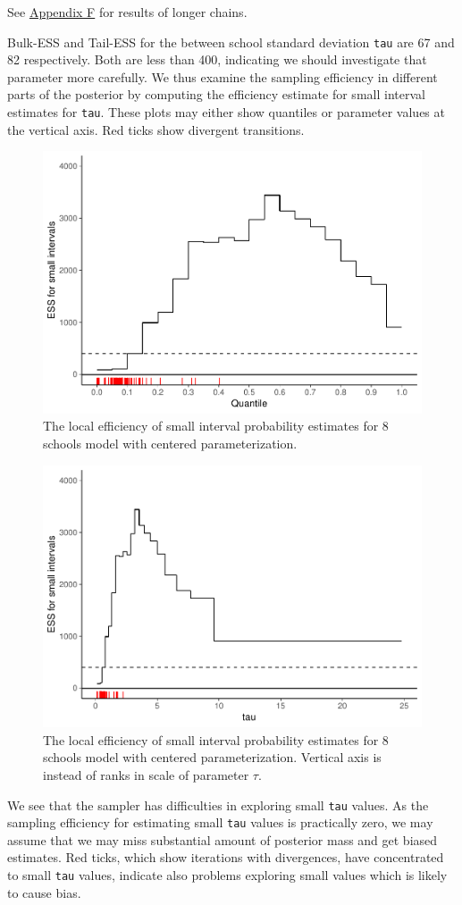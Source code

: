 \documentclass[american,]{article}
\begin{document}
See \protect\hyperlink{AppendixF}{Appendix F} for results of longer
chains.

Bulk-ESS and Tail-ESS for the between school standard deviation
\texttt{tau} are 67 and 82 respectively. Both are less than 400,
indicating we should investigate that parameter more carefully. We thus
examine the sampling efficiency in different parts of the posterior by
computing the efficiency estimate for small interval estimates for
\texttt{tau}. These plots may either show quantiles or parameter values
at the vertical axis. Red ticks show divergent transitions.

\begin{figure}[tp]
  \centering
  \includegraphics[width=0.6\linewidth]{graphics/local-ess-fit-cp-1.pdf}
  \caption{The local efficiency of small interval probability estimates for 8 schools model with centered parameterization.}
\end{figure}

\begin{figure}[tp]
  \centering
  \includegraphics[width=0.6\linewidth]{graphics/local-ess-fit-cp-norank-1.pdf}
  \caption{The local efficiency of small interval probability estimates for 8 schools model with centered parameterization. Vertical axis is instead of ranks in scale of parameter $\tau$.}
\end{figure}

We see that the sampler has difficulties in exploring small \texttt{tau}
values. As the sampling efficiency for estimating small \texttt{tau}
values is practically zero, we may assume that we may miss substantial
amount of posterior mass and get biased estimates. Red ticks, which show
iterations with divergences, have concentrated to small \texttt{tau}
values, indicate also problems exploring small values which is likely to
cause bias.
\end{document}
